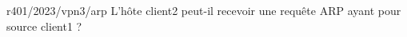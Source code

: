 \begin{question}{r401/2023/vpn3/arp}
  L'hôte client2 peut-il recevoir une requête ARP ayant pour source
  client1 ?
  \begin{reponseshoriz}
  \end{reponseshoriz}
\end{question}
